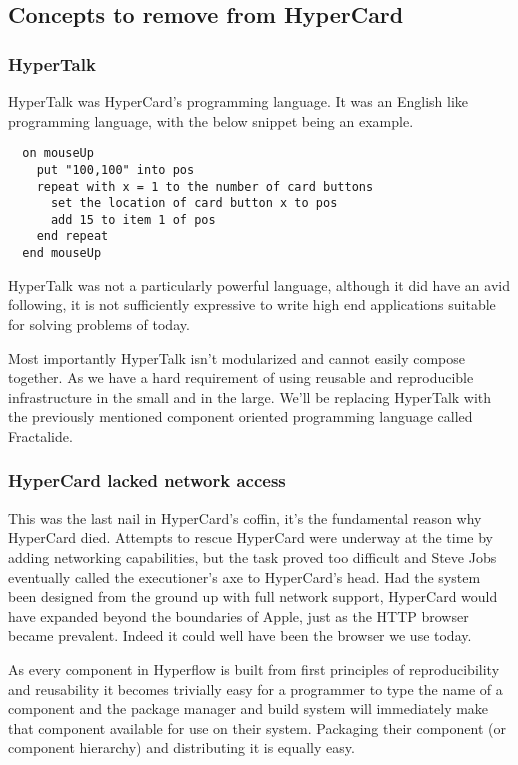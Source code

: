 \documentclass[%
 aip,
 jmp,%
 amsmath,amssymb,
 preprint,
 reprint,
 author-year,
 author-numerical,
]{revtex4-1}
\begin{document}
\subsection{\label{sec:concepts to remove from HyperCard}Concepts to remove from HyperCard}
\subsubsection{\label{sec:HyperTalk}HyperTalk}
HyperTalk was HyperCard's programming language. It was an English like programming language, with the below snippet being an example.
\begin{lstlisting}
  on mouseUp
    put "100,100" into pos
    repeat with x = 1 to the number of card buttons
      set the location of card button x to pos
      add 15 to item 1 of pos
    end repeat
  end mouseUp
\end{lstlisting}

HyperTalk was not a particularly powerful language, although it did have an avid following, it is not sufficiently expressive to write high end applications suitable for solving problems of today.



Most importantly HyperTalk isn't modularized and cannot easily compose together. As we have a hard requirement of using reusable and reproducible infrastructure in the small and in the large. We'll be replacing HyperTalk with the previously mentioned component oriented programming language called Fractalide.

\subsubsection{\label{sec:HyperCard lacked network access}HyperCard lacked network access}

This was the last nail in HyperCard's coffin, it's the fundamental reason why HyperCard died. Attempts to rescue HyperCard were underway at the time by adding networking capabilities, but the task proved too difficult and Steve Jobs eventually called the executioner's axe to HyperCard's head. Had the system been designed from the ground up with full network support, HyperCard would have expanded beyond the boundaries of Apple, just as the HTTP browser became prevalent. Indeed it could well have been the browser we use today.

As every component in Hyperflow is built from first principles of reproducibility and reusability it becomes trivially easy for a programmer to type the name of a component and the package manager and build system will immediately make that component available for use on their system. Packaging their component (or component hierarchy) and distributing it is equally easy.
\end{document}
